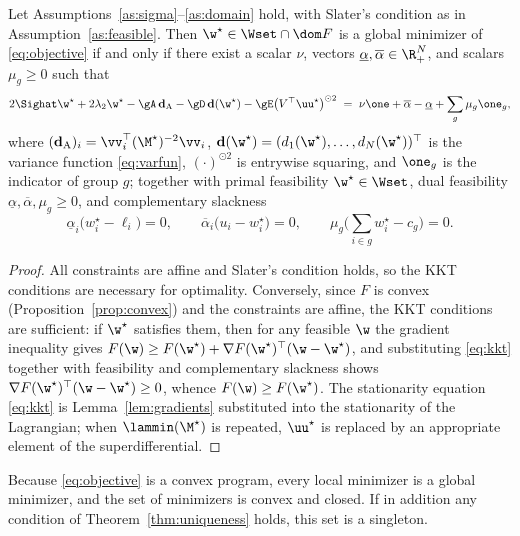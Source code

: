 \begin{theorem}
\label{thm:kkt}
Let Assumptions~\ref{as:sigma}--\ref{as:domain} hold, with Slater's condition as
in Assumption~\ref{as:feasible}. Then $\w^\star\in\Wset\cap\dom F$ is a global
minimizer of \eqref{eq:objective} if and only if there exist a scalar $\nu$,
vectors $\underline{\alpha},\overline{\alpha}\in\R^{N}_{+}$, and scalars
$\mu_g\ge0$ such that
\begin{equation}
  2\Sighat\w^\star+2\lambda_2\w^\star
  -\gA\,\mathbf d_{\mathrm{A}}
  -\gD\,\mathbf d(\w^\star)
  -\gE\big(V^\top\uu^\star\big)^{\odot2}
  \;=\;\nu\one+\overline{\alpha}-\underline{\alpha}
  +\sum_g\mu_g\one_g ,
  \label{eq:kkt}
\end{equation}
where $(\mathbf d_{\mathrm{A}})_i=\vv_i^\top(\M^\star)^{-2}\vv_i$,
$\mathbf d(\w^\star)=(d_1(\w^\star),\dots,d_N(\w^\star))^\top$ is the variance
function \eqref{eq:varfun}, $(\cdot)^{\odot2}$ is entrywise squaring, and
$\one_g$ is the indicator of group $g$; together with primal feasibility
$\w^\star\in\Wset$, dual feasibility
$\underline{\alpha},\overline{\alpha},\mu_g\ge0$, and complementary slackness
\[
  \underline{\alpha}_i\big(w_i^\star-\ell_i\big)=0,\qquad
  \overline{\alpha}_i\big(u_i-w_i^\star\big)=0,\qquad
  \mu_g\Big(\textstyle\sum_{i\in g}w_i^\star-c_g\Big)=0 .
\]
\end{theorem}

\begin{proof}
All constraints are affine and Slater's condition holds, so the KKT conditions
are necessary for optimality. Conversely, since $F$ is convex
(Proposition~\ref{prop:convex}) and the constraints are affine, the KKT
conditions are sufficient: if $\w^\star$ satisfies them, then for any feasible
$\w$ the gradient inequality gives
$F(\w)\ge F(\w^\star)+\nabla F(\w^\star)^\top(\w-\w^\star)$, and substituting
\eqref{eq:kkt} together with feasibility and complementary slackness shows
$\nabla F(\w^\star)^\top(\w-\w^\star)\ge0$, whence $F(\w)\ge F(\w^\star)$. The
stationarity equation \eqref{eq:kkt} is Lemma~\ref{lem:gradients} substituted into
the stationarity of the Lagrangian; when $\lammin(\M^\star)$ is repeated,
$\uu^\star$ is replaced by an appropriate element of the superdifferential.
\end{proof}

\begin{corollary}
\label{cor:global}
Because \eqref{eq:objective} is a convex program, every local minimizer is a
global minimizer, and the set of minimizers is convex and closed. If in addition
any condition of Theorem~\ref{thm:uniqueness} holds, this set is a singleton.
\end{corollary}

